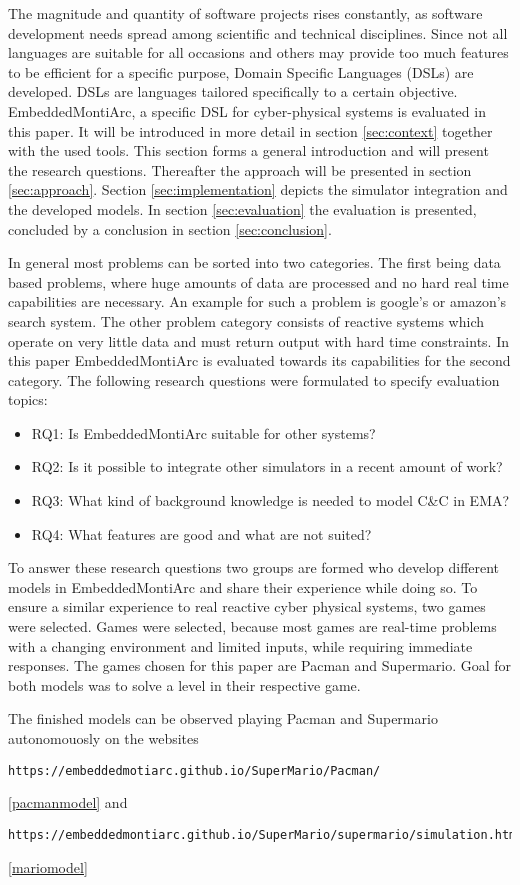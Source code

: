 The magnitude and quantity of software projects rises constantly, as software development needs spread among scientific and technical disciplines. Since not all languages are suitable for all occasions and others may provide too much features to be efficient for a specific purpose, Domain Specific Languages (DSLs) are developed. DSLs are languages tailored specifically to a certain objective.
EmbeddedMontiArc, a specific DSL for cyber-physical systems is evaluated in this paper. It will be introduced in more detail in section \ref{sec:context} together with the used tools. This section forms a general introduction and will present the research questions.
Thereafter the approach will be presented in section \ref{sec:approach}. Section \ref{sec:implementation} depicts the simulator integration and the developed models. In section \ref{sec:evaluation} the evaluation is presented, concluded by a conclusion in section \ref{sec:conclusion}.

In general most problems can be sorted into two categories. The first being data based problems, where huge amounts of data are processed and no hard real time capabilities are necessary. An example for such a problem is google's or amazon's search system. The other problem category consists of reactive systems which operate on very little data and must return output with hard time constraints. In this paper EmbeddedMontiArc is evaluated towards its capabilities for the second category.
The following research questions were formulated to specify evaluation topics:

\begin{itemize}
	\item RQ1: Is EmbeddedMontiArc suitable for other systems?
	\item RQ2: Is it possible to integrate other simulators in a recent amount of work?
	\item RQ3: What kind of background knowledge is needed to model C\&C in EMA?
	\item RQ4: What features are good and what are not suited?
\end{itemize}

To answer these research questions two groups are formed who develop different models in EmbeddedMontiArc and share their experience while doing so. To ensure a similar experience to real reactive cyber physical systems, two games were selected.
Games were selected, because most games are real-time problems with a changing environment and limited inputs, while requiring immediate responses.
The games chosen for this paper are Pacman and Supermario. Goal for both models was to solve a level in their respective game.

The finished models can be observed playing Pacman and Supermario autonomouosly on the websites 
\begin{lstlisting}
https://embeddedmotiarc.github.io/SuperMario/Pacman/
\end{lstlisting}
\ref{pacmanmodel}
and
\begin{lstlisting}
https://embeddedmontiarc.github.io/SuperMario/supermario/simulation.html
\end{lstlisting}
\ref{mariomodel}